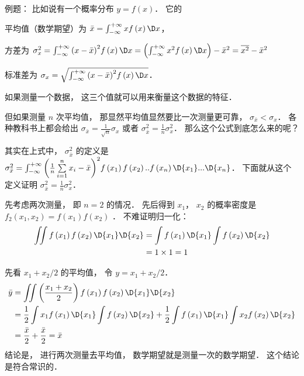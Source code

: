 
例题： 比如说有一个概率分布 $y = f\left( x \right)$．  它的

平均值（数学期望）为 $\bar x = \int_{ - \infty }^{ + \infty } {xf\left( x \right)\D x} $，  

方差为  $\sigma_x^2 = \int_{ - \infty }^{ + \infty } {{{\left( {x - \bar x} \right)}^2}f\left( x \right)\D x}  = \left( {\int_{ - \infty }^{ + \infty } {{x^2}f\left( x \right)\D x} } \right) - {\bar x^2} = \overline {x^2}  - {\bar x^2}$ 

标准差为 ${\sigma_x} = \sqrt {\int_{ - \infty }^{ + \infty } {{{\left( {x - \bar x} \right)}^2}f\left( x \right)\D x} } $．  

如果测量一个数据， 这三个值就可以用来衡量这个数据的特征．

但如果测量 $n$ 次平均值， 那显然平均值显然要比一次测量更可靠， ${\sigma_{\bar x}} < {\sigma_x}$．   各种教科书上都会给出 ${\sigma_{\bar x}} = \frac{1}{\sqrt n }{\sigma_x}$ 或者 $\sigma_{\bar x}^2 = \frac{1}{n}\sigma_x^2$．  那么这个公式到底怎么来的呢？

其实在上式中， $\sigma_{\bar x}^2$  的定义是 $\sigma_{\bar x}^2 = \int_{ - \infty }^{ + \infty } {{{\left( {\frac{1}{n}\sum\limits_{i = 1}^n {x_i}  - \bar x} \right)}^2}f\left( {x_1} \right)f\left( {x_2} \right)..f\left( {x_n} \right)\D {x_1}...\D {x_n}} $．  下面就从这个定义证明 $\sigma_{\bar x}^2 = \frac{1}{n}\sigma_x^2$． 

先考虑两次测量， 即 $n = 2$ 的情况． 先后得到 ${x_1}$，  ${x_2}$ 的概率密度是 ${f_2}\left( {{x_1},{x_2}} \right) = f\left( {x_1} \right)f\left( {x_2} \right)$ 
．  不难证明归一化：
 \begin{equation}
\begin{aligned}
  \iint {f\left( {x_1} \right)f\left( {x_2} \right)\D {x_1}\D {x_2}} &= \int {f\left( {x_1} \right)\D {x_1}} \int {f\left( {x_2} \right)\D {x_2}}  \hfill \\
   &= 1 \times 1 = 1 \hfill \\ 
\end{aligned}
\end{equation}

先看 ${{x_1} + {x_2}}/{2}$ 的平均值， 令 $y = {{x_1} + {x_2}}/{2}$． 
  \begin{equation}
\begin{aligned}
  \bar y &= \iint {\left( {\frac{{x_1} + {x_2}}{2}} \right)f\left( {x_1} \right)f\left( {x_2} \right)\D {x_1}\D {x_2}} \hfill \\
  & = \frac{1}{2}\int {{x_1}f\left( {x_1} \right)\D {x_1}} \int {f\left( {x_2} \right)\D {x_2}}  + \frac{1}{2}\int {f\left( {x_1} \right)\D {x_1}} \int {{x_2}f\left( {x_2} \right)\D {x_2}}  \hfill \\
   &= \frac{\bar x}{2} + \frac{\bar x}{2} = \bar x \hfill \\ 
\end{aligned} 
\end{equation}
结论是， 进行两次测量去平均值， 数学期望就是测量一次的数学期望． 这个结论是符合常识的．

